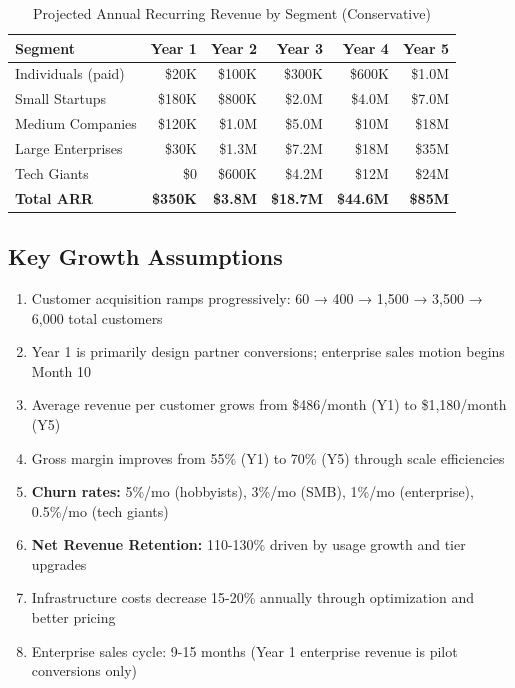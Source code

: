 \begin{table}[ht]
\centering
\small
\begin{tabular}{|l|r|r|r|r|r|}
\hline
\textbf{Segment} & \textbf{Year 1} & \textbf{Year 2} & \textbf{Year 3} & \textbf{Year 4} & \textbf{Year 5} \\
\hline
Individuals (paid) & \$20K & \$100K & \$300K & \$600K & \$1.0M \\
Small Startups & \$180K & \$800K & \$2.0M & \$4.0M & \$7.0M \\
Medium Companies & \$120K & \$1.0M & \$5.0M & \$10M & \$18M \\
Large Enterprises & \$30K & \$1.3M & \$7.2M & \$18M & \$35M \\
Tech Giants & \$0 & \$600K & \$4.2M & \$12M & \$24M \\
\hline
\textbf{Total ARR} & \textbf{\$350K} & \textbf{\$3.8M} & \textbf{\$18.7M} & \textbf{\$44.6M} & \textbf{\$85M} \\
\hline
\end{tabular}
\caption{Projected Annual Recurring Revenue by Segment (Conservative)}
\end{table}

\subsection{Key Growth Assumptions}

\begin{enumerate}[noitemsep]
    \item Customer acquisition ramps progressively: 60 → 400 → 1,500 → 3,500 → 6,000 total customers
    \item Year 1 is primarily design partner conversions; enterprise sales motion begins Month 10
    \item Average revenue per customer grows from \$486/month (Y1) to \$1,180/month (Y5)
    \item Gross margin improves from 55\% (Y1) to 70\% (Y5) through scale efficiencies
    \item \textbf{Churn rates:} 5\%/mo (hobbyists), 3\%/mo (SMB), 1\%/mo (enterprise), 0.5\%/mo (tech giants)
    \item \textbf{Net Revenue Retention:} 110-130\% driven by usage growth and tier upgrades
    \item Infrastructure costs decrease 15-20\% annually through optimization and better pricing
    \item Enterprise sales cycle: 9-15 months (Year 1 enterprise revenue is pilot conversions only)
\end{enumerate}

